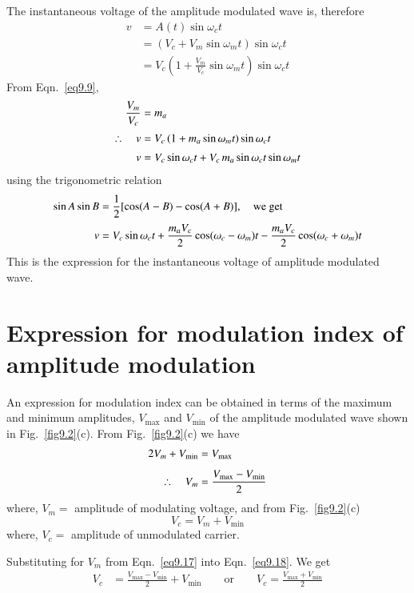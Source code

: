 The instantaneous voltage of the amplitude modulated wave is, therefore
\begin{align*}
v &= A(t)\sin \omega_{c}t\\[2pt] 
 &= (V_{c}+V_{m}\sin \omega_{m}t)\sin \omega_{c}t\\[2pt]
  &= V_{c}\left(1+\frac{V_{m}}{V_{c}}\sin \omega_{m}t\right)\sin \omega_{c}t
\end{align*}
\indent
From Eqn.~\eqref{eq9.9},
\begin{align}
\frac{V_{m}}{V_{c}} &= m_{a}\notag\\[2pt]
\therefore\quad v &= V_{c}\,(1+m_{a}\sin \omega_{m}t)\sin \omega_{c}t\label{eq9.14}\\[2pt]
v &= V_{c}\sin \omega_{c}t+V_{c}\,m_{a}\sin \omega_{c}t\sin \omega_{m}t\label{eq9.15}
\end{align}
using the trigonometric relation
\begin{align}
\sin A\sin B &= \frac{1}{2}[\cos (A-B)-\cos(A+B)],\quad\text{we get}\notag\\[2pt]
v &= V_{c}\sin \omega_{c}t +\frac{m_{a}V_{c}}{2}\cos (\omega_{c}-\omega_{m})t-\frac{m_{a}V_{c}}{2}\cos (\omega_{c}+\omega_{m})t\label{eq9.16}
\end{align}
This is the expression for the instantaneous voltage of amplitude modulated wave.

\section{Expression for modulation index of amplitude modulation}\label{sec9.10}

An expression for modulation index can be obtained in terms of the maximum and minimum amplitudes, $V_{\max}$ and $V_{\min}$ of the amplitude modulated wave shown in Fig.~\ref{fig9.2}(c). From Fig.~\ref{fig9.2}(c) we have
\begin{align}
2V_{m}+V_{\min} &= V_{\max}\notag\\[4pt]
\therefore\quad V_{m} &= \frac{V_{\max}-V_{\min}}{2}\label{eq9.17}
\end{align}
where, $V_{m}=$ amplitude of modulating voltage, and from Fig.~\ref{fig9.2}(c)
\begin{equation}
V_{c}=V_{m}+V_{\min}\label{eq9.18}
\end{equation}
where, $V_{c}=$ amplitude of unmodulated carrier.

Substituting for $V_{m}$ from Eqn.~\eqref{eq9.17} into Eqn.~\eqref{eq9.18}. We get
\begin{align}
V_{c} &= \frac{V_{\max}-V_{\min}}{2}+V_{\min}\qquad
\text{or}\qquad V_{c} = \frac{V_{\max}+V_{\min}}{2}\label{eq9.19}
\end{align}

